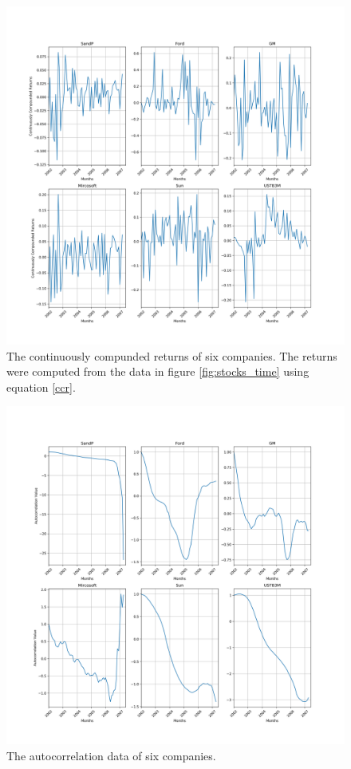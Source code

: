 \documentclass[11pt, letterpage]{article}
\begin{document}
\begin{figure}
  \includegraphics[width=\pagewidth]{stocks_returns.png}
  \caption{
    The continuously compunded returns of six companies. The returns were
    computed from the data in figure \ref{fig:stocks_time} using equation
    \ref{ccr}.
  }
  \label{fig:stocks_returns}
\end{figure}

\begin{figure}
  \includegraphics[width=\pagewidth]{stocks_ac.png}
  \caption{
    The autocorrelation data of six companies.
  }
  \label{fig:stocks_ac}
\end{figure}
\end{document}

